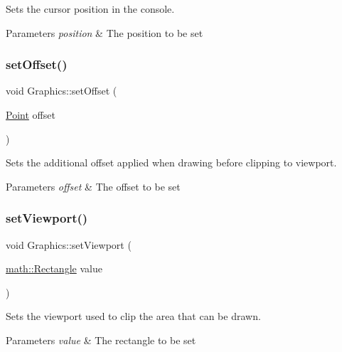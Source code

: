 Sets the cursor position in the console. 


\begin{DoxyParams}{Parameters}
{\em position} & The position to be set\\
\hline
\end{DoxyParams}
\mbox{\label{class_graphics_aa2719845f973c66d61a6ecf9a8bddaf4}} 
\subsubsection{\texorpdfstring{setOffset()}{setOffset()}}
{\footnotesize\ttfamily void Graphics\+::set\+Offset (\begin{DoxyParamCaption}\item[{\mbox{\hyperlink{struct_point}{Point}}}]{offset }\end{DoxyParamCaption})}



Sets the additional offset applied when drawing before clipping to viewport. 


\begin{DoxyParams}{Parameters}
{\em offset} & The offset to be set\\
\hline
\end{DoxyParams}
\mbox{\label{class_graphics_a9b7d5d06b00c13570dc912e7ce72763c}} 
\subsubsection{\texorpdfstring{setViewport()}{setViewport()}}
{\footnotesize\ttfamily void Graphics\+::set\+Viewport (\begin{DoxyParamCaption}\item[{\mbox{\hyperlink{structmath_1_1_rectangle}{math\+::\+Rectangle}}}]{value }\end{DoxyParamCaption})}



Sets the viewport used to clip the area that can be drawn. 


\begin{DoxyParams}{Parameters}
{\em value} & The rectangle to be set\\
\hline
\end{DoxyParams}
\mbox{\label{class_graphics_a11f04444e9fb3fc24ce14f6c1f2d19fc}} 
